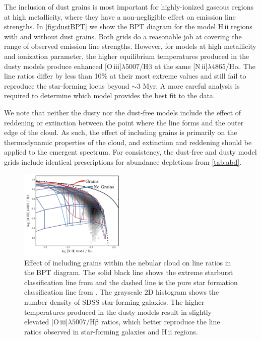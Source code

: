 \documentclass[trackchanges, twocolumn, tighten]{aastex61}
\newcommand{\Fig}[1]{\autoref{fig:#1}}
\newcommand{\Tab}[1]{\autoref{tab:#1}}
\newcommand{\nii}{[N\,{\sc ii}]\xspace}
\newcommand{\oiii}{[O\,{\sc iii}]\xspace}
\newcommand{\ha}{\ensuremath{\mathrm{H\alpha}}}
\newcommand{\hb}{\ensuremath{\mathrm{H\beta}}}
\newcommand{\hii}{H\,{\sc ii}\xspace}
\newcommand\lam[1]{\ensuremath{\lambda #1}}
\newcommand\niiha{\nii{}\lam{4865}/\ha{}}
\newcommand\oiiihb{\oiii{}\lam{5007}/\hb{}}
\begin{document}
The inclusion of dust grains is most important for highly-ionized gaseous regions at high metallicity, where they have a non-negligible effect on emission line strengths. In \Fig{dustBPT} we show the BPT diagram for the model \hii regions with and without dust grains. Both grids do a reasonable job at covering the range of observed emission line strengths. However, for models at high metallicity and ionization parameter, the higher equilibrium temperatures produced in the dusty models produce enhanced \oiiihb{} at the same \niiha{}. The line ratios differ by less than 10\% at their most extreme values and still fail to reproduce the star-forming locus beyond $\sim 3$ Myr. A more careful analysis is required to determine which model provides the best fit to the data.

We note that neither the dusty nor the dust-free models include the effect of reddening or extinction between the point where the line forms and the outer edge of the cloud. As such, the effect of including grains is primarily on the thermodynamic properties of the cloud, and extinction and reddening should be applied to the emergent spectrum. For consistency, the dust-free and dusty model grids include identical prescriptions for abundance depletions from \Tab{abd}.
\begin{figure}
  \begin{centering}
    \includegraphics[width=0.45\textwidth]{f29.pdf}
    \caption{Effect of including grains within the nebular cloud on line ratios in the BPT diagram. The solid black line shows the extreme starburst classification line from \citet{Kewley01} and the dashed line is the pure star formation classification line from \citet{Kauffmann03a}. The grayscale 2D histogram shows the number density of SDSS star-forming galaxies. The higher temperatures produced in the dusty models result in slightly elevated \oiiihb{} ratios, which better reproduce the line ratios observed in star-forming galaxies and \hii regions.}
    \label{fig:dustBPT}
  \end{centering}
\end{figure}
\end{document}
